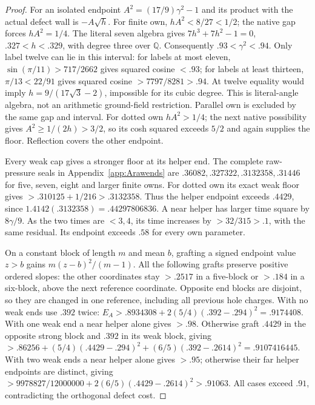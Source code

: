 \begin{proof}
For an isolated endpoint $A^2=(17/9)\gamma^2-1$ and its
product with the actual defect wall is $-A\sqrt h$.
For finite own, $hA^2<8/27<1/2$; the native gap forces
$hA^2=1/4$. The literal seven algebra gives
$7h^3+7h^2-1=0$, $.327<h<.329$, with degree three over
$\mathbb Q$. Consequently $.93<\gamma^2<.94$.
Only label twelve can lie in this interval: for labels at most
eleven, $\sin(\pi/11)>717/2662$ gives squared cosine $<.93$;
for labels at least thirteen, $\pi/13<22/91$ gives squared
cosine $>7797/8281>.94$.
At twelve equality would imply $h=9/(17\sqrt3-2)$, impossible
for its cubic degree. This is literal-angle algebra, not an
arithmetic ground-field restriction. Parallel own is excluded
by the same gap and interval. For dotted own $hA^2>1/4$;
the next native possibility gives $A^2\ge1/(2h)>3/2$,
so its cosh squared exceeds $5/2$ and again supplies the floor.
Reflection covers the other endpoint.

Every weak cap gives a stronger floor at its helper end.
The complete raw-pressure seals in Appendix~\ref{app:Arawends}
are $.36082,.327322,.3132358,.31446$ for five, seven, eight
and larger finite owns. For dotted own its exact weak floor
gives $>.310125+1/216>.3132358$.
Thus the helper endpoint exceeds $.4429$, since
$1.4142(.3132358)=.44297806836$.
A near helper has larger time square by $8\gamma/9$.
As the two times are $<3,4$, its time increases by
$>32/315>.1$, with the same residual. Its endpoint exceeds
$.58$ for every own parameter.

On a constant block of length $m$ and mean $b$, grafting a
signed endpoint value $z>b$ gains $m(z-b)^2/(m-1)$.
All the following grafts preserve positive ordered slopes:
the other coordinates stay $>.2517$ in a five-block or
$>.184$ in a six-block, above the next reference coordinate.
Opposite end blocks are disjoint, so they are changed in one
reference, including all previous hole charges.
With no weak ends use $.392$ twice:
$E_A>.8934308+2(5/4)(.392-.294)^2=.9174408$.
With one weak end a near helper alone gives $>.98$.
Otherwise graft $.4429$ in the opposite strong block and
$.392$ in its weak block, giving
$>.86256+(5/4)(.4429-.294)^2+(6/5)(.392-.2614)^2
=.9107416445$.
With two weak ends a near helper alone gives $>.95$;
otherwise their far helper endpoints are distinct, giving
$>9978827/12000000+2(6/5)(.4429-.2614)^2>.91063$.
All cases exceed $.91$, contradicting the orthogonal defect cost.
\end{proof}

